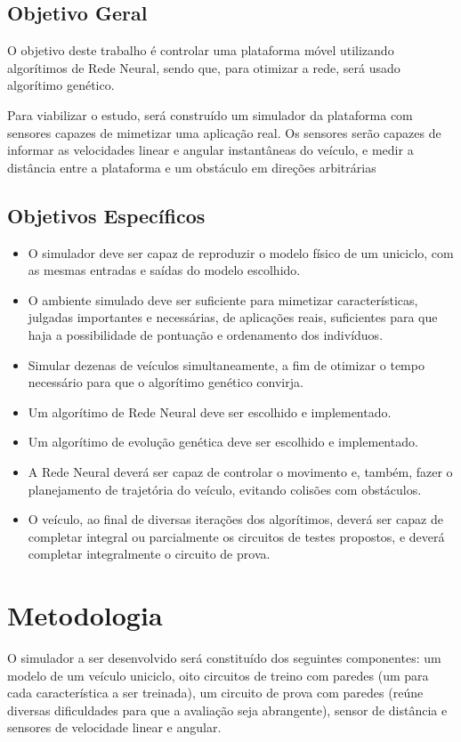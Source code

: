\subsection{Objetivo Geral}
O objetivo deste trabalho é controlar uma plataforma móvel utilizando algorítimos de Rede Neural, sendo que, para otimizar a rede, será usado algorítimo genético.

Para viabilizar o estudo, será construído um simulador da plataforma com sensores capazes de mimetizar uma aplicação real. Os sensores serão capazes de informar as velocidades linear e angular instantâneas do veículo, e medir a distância entre a plataforma e um obstáculo em direções arbitrárias

\subsection{Objetivos Específicos}

\begin{itemize}
  \item O simulador deve ser capaz de reproduzir o modelo físico de um uniciclo, com as mesmas entradas e saídas do modelo escolhido.
  \item O ambiente simulado deve ser suficiente para mimetizar características, julgadas importantes e necessárias, de aplicações reais, suficientes para que haja a possibilidade de pontuação e ordenamento dos indivíduos.
  \item Simular dezenas de veículos simultaneamente, a fim de otimizar o tempo necessário para que o algorítimo genético convirja.
  \item Um algorítimo de Rede Neural deve ser escolhido e implementado.
  \item Um algorítimo de evolução genética deve ser escolhido e implementado.
  \item A Rede Neural deverá ser capaz de controlar o movimento e, também, fazer o planejamento de trajetória do veículo, evitando colisões com obstáculos.
  \item O veículo, ao final de diversas iterações dos algorítimos, deverá ser capaz de completar integral ou parcialmente os circuitos de testes propostos, e deverá completar integralmente o circuito de prova.
\end{itemize}

\section{Metodologia}
O simulador a ser desenvolvido será constituído dos seguintes componentes: um modelo de um veículo uniciclo, oito circuitos de treino com paredes (um para cada característica a ser treinada), um circuito de prova com paredes (reúne diversas dificuldades para que a avaliação seja abrangente), sensor de distância e sensores de velocidade linear e angular.

